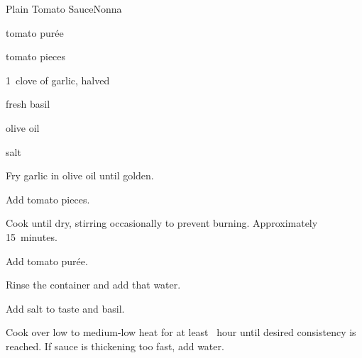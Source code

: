 \begin{recipe}{Plain Tomato Sauce}{Nonna}{}

\begin{ingredients}
\item {} tomato pur\'ee
\item \ltr{\half} tomato pieces
\item 1~clove of garlic, halved
\item fresh basil
\item olive oil
\item salt
\end{ingredients}

\begin{directions}
\item Fry garlic in olive oil until golden.
\item Add tomato pieces.
\item Cook until dry, stirring occasionally to prevent burning. Approximately 15~minutes.
\item Add tomato pur\'ee.
\item Rinse the container and add that water.
\item Add salt to taste and basil.
\item Cook over low to medium-low heat for at least \half~hour until desired consistency is reached. If sauce is thickening too fast, add water.
\end{directions}

\end{recipe}
